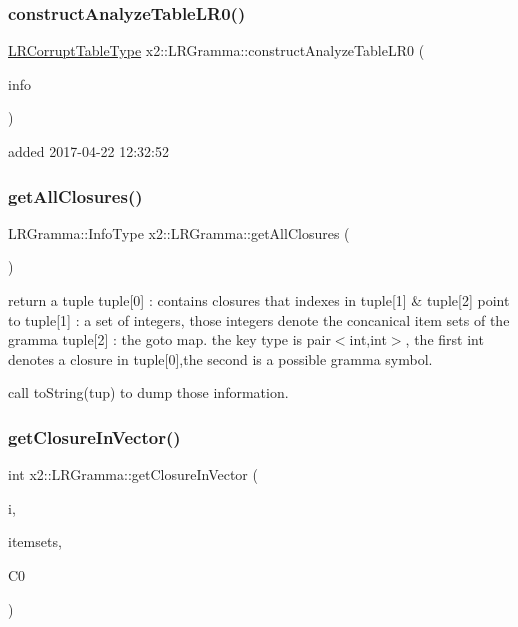 \subsubsection{\texorpdfstring{construct\+Analyze\+Table\+L\+R0()}{constructAnalyzeTableLR0()}}
{\footnotesize\ttfamily \hyperlink{classx2_1_1_gramma_a03901eb5b196689b901fbf23e5bb9f0e}{L\+R\+Corrupt\+Table\+Type} x2\+::\+L\+R\+Gramma\+::construct\+Analyze\+Table\+L\+R0 (\begin{DoxyParamCaption}\item[{const Info\+Type \&}]{info }\end{DoxyParamCaption})}

added 2017-\/04-\/22 12\+:32\+:52 \mbox{\label{classx2_1_1_l_r_gramma_a03deaa81155f09b014629b32769b8228}} 
\subsubsection{\texorpdfstring{get\+All\+Closures()}{getAllClosures()}}
{\footnotesize\ttfamily L\+R\+Gramma\+::\+Info\+Type x2\+::\+L\+R\+Gramma\+::get\+All\+Closures (\begin{DoxyParamCaption}{ }\end{DoxyParamCaption})}

return a tuple tuple\mbox{[}0\mbox{]} \+: contains closures that indexes in tuple\mbox{[}1\mbox{]} \& tuple\mbox{[}2\mbox{]} point to tuple\mbox{[}1\mbox{]} \+: a set of integers, those integers denote the concanical item sets of the gramma tuple\mbox{[}2\mbox{]} \+: the goto map. the key type is pair$<$int,int$>$, the first int denotes a closure in tuple\mbox{[}0\mbox{]},the second is a possible gramma symbol.

call to\+String(tup) to dump those information. \mbox{\label{classx2_1_1_l_r_gramma_a6f9db2e24c2f5ccdbeb7f2a5c3e6f46e}} 
\subsubsection{\texorpdfstring{get\+Closure\+In\+Vector()}{getClosureInVector()}}
{\footnotesize\ttfamily int x2\+::\+L\+R\+Gramma\+::get\+Closure\+In\+Vector (\begin{DoxyParamCaption}\item[{const Item\+Type \&}]{i,  }\item[{Closures\+Vector \&}]{itemsets,  }\item[{std\+::map$<$ Item\+Type, int $>$ \&}]{C0 }\end{DoxyParamCaption})}

